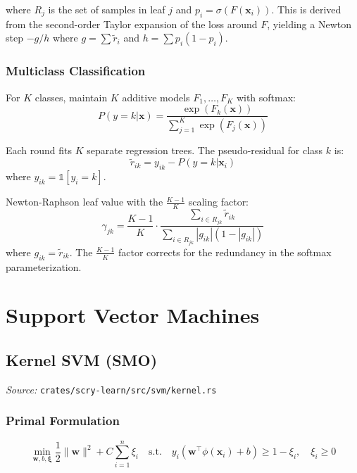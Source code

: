 \documentclass[11pt,a4paper]{article}
\theoremstyle{definition}
\theoremstyle{remark}
\begin{document}
where $R_j$ is the set of samples in leaf $j$ and $p_i = \sigma(F(\mathbf{x}_i))$. This is derived from the second-order Taylor expansion of the loss around $F$, yielding a Newton step $-g/h$ where $g = \sum \tilde{r}_i$ and $h = \sum p_i(1-p_i)$.

\subsubsection*{Multiclass Classification}

For $K$ classes, maintain $K$ additive models $F_1, \ldots, F_K$ with softmax:
\begin{equation}
P(y=k|\mathbf{x}) = \frac{\exp(F_k(\mathbf{x}))}{\sum_{j=1}^K \exp(F_j(\mathbf{x}))}
\end{equation}

Each round fits $K$ separate regression trees. The pseudo-residual for class $k$ is:
\begin{equation}
\tilde{r}_{ik} = y_{ik} - P(y=k|\mathbf{x}_i)
\end{equation}
where $y_{ik} = \mathbb{1}[y_i = k]$.

Newton-Raphson leaf value with the $\frac{K-1}{K}$ scaling factor:
\begin{equation}
\gamma_{jk} = \frac{K-1}{K} \cdot \frac{\sum_{i \in R_{jk}} \tilde{r}_{ik}}{\sum_{i \in R_{jk}} |g_{ik}|(1 - |g_{ik}|)}
\end{equation}
where $g_{ik} = \tilde{r}_{ik}$. The $\frac{K-1}{K}$ factor corrects for the redundancy in the softmax parameterization.


\section{Support Vector Machines}

\subsection{Kernel SVM (SMO)}
\label{sec:ksvm}

\noindent\textit{Source:} \texttt{crates/scry-learn/src/svm/kernel.rs}

\subsubsection*{Primal Formulation}
\begin{equation}
\min_{\mathbf{w}, b, \boldsymbol{\xi}} \frac{1}{2}\|\mathbf{w}\|^2 + C\sum_{i=1}^n \xi_i \quad \text{s.t.} \quad y_i(\mathbf{w}^\top\phi(\mathbf{x}_i) + b) \geq 1 - \xi_i, \quad \xi_i \geq 0
\end{equation}
\end{document}
